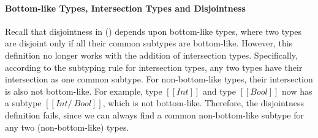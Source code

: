 
\paragraph{Bottom-like Types, Intersection Types and Disjointness}
\noindent %
Recall that disjointness in  () depends
upon bottom-like types, where two types are disjoint only if all their common
subtypes are bottom-like. However, this definition no longer works with the
addition of intersection types. Specifically, according to the subtyping rule
for intersection types, any two types have their intersection as one common subtype.
For non-bottom-like types, their intersection is also not bottom-like. For
example, type $[[Int]]$ and type $[[Bool]]$ now has a subtype $[[Int /\ Bool]]$,
which is not bottom-like. Therefore, the disjointness definition fails, since we
can always find a common non-bottom-like subtype for any two (non-bottom-like)
types.

\begin{comment}
Reader may think at this point to add intersection of non-overlapping types such as $[[Int /\ Bool]]$
in bottom-like types to solve the problem. A trivial and intuitive approach to think of is:

\begin{center}
\drule[]{bl-andsub}
\end{center}

\noindent \Rref{bl-andsub} states that if two types $[[A]]$ and $[[B]]$
are not subtypes of each other (i.e. non-overlapping) then intersection of
such types $[[A /\ B]]$ is bottom-like.
\Rref{bl-andsub} works for simple cases such as $[[Int]]$ and $[[Bool]]$.
But it fails if  $[[A]]$ = $[[Int /\ Bool]]$ and 
$[[B]]$ = $[[Int /\ Bool]]$.
Because $[[A]]$ ($[[Int /\ Bool]]$) and $[[B]]$ ($[[Int /\ Bool]]$) are subtypes
of each other and are not bottom-like as per \rref{bl-andsub}.
So, naive addition of \rref{bl-andsub} skips potential bottem-like types.
Another alternative may be:

\begin{center}
\drule[]{bl-anddisj}
\end{center}

\noindent \Rref{bl-anddisj} states that if two types $[[A]]$ and $[[B]]$ are disjoint,
then intersection of such types $[[A /\ B]]$ is bottom-like.
But \rref{bl-anddisj} imposes additional complexities of mutually
dependent definitions among disjointness and bottom-like.
This makes completeness challenging or even impossible to prove.
\end{comment}
